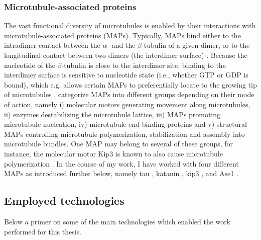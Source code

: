 \subsubsection{Microtubule-associated proteins}
\label{sec:MAPs}
The vast functional diversity of microtubules is enabled by their interactions with microtubule-associated proteins (MAPs). Typically, MAPs bind either to the intradimer contact between the $\alpha$- and the $\beta$-tubulin of a given dimer, or to the longitudinal contact between two dimers (the interdimer surface) . Because the nucleotide of the $\beta$-tubulin is close to the interdimer site, binding to the interdimer surface is sensitive to nucleotide state (i.e., whether GTP or GDP is bound), which e.g. allows certain MAPs to preferentially locate to the growing tip of microtubules . \cite{BODAKUNTLA2019804} categorize MAPs into different groups depending on their mode of action, namely i) molecular motors generating movement along microtubules, ii) enzymes destabilizing the microtubule lattice, iii) MAPs promoting microtubule nucleation, iv) microtubule-end binding proteins and v) structural MAPs controlling microtubule polymerization, stabilization and assembly into microtubule bundles. One MAP may belong to several of these groups, for instance, the molecular motor Kip3 is known to also cause microtubule polymerization \parencite{Gardner2011a}. In the course of my work, I have worked with four different MAPs as introduced further below, namely tau , katanin , kip3 , and Ase1 . 

\subsection{Employed technologies}
\label{sec:methods_intro}
Below a primer on some of the main technologies which enabled the work performed for this thesis.

